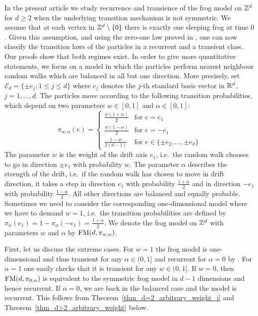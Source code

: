 In the present article we study recurrence and transience of the frog model on $\mathbb{Z}^d$ for $d \geq 2$ when the underlying transition mechanism is not  symmetric. We assume that at each vertex in $\mathbb{Z}^d\setminus\{0\}$ there is exactly one sleeping frog at time $0$. 
Given this assumption, and using the zero-one law proved in \cite{KZ17}, one can now classify the transition laws of the particles in a recurrent and a transient class. Our proofs show that both regimes exist. In order to give more quantitative statements, we focus on a model in which the particles perform nearest neighbour random walks which are balanced in all but one direction. More precisely,
set $\mathcal{E}_d=\{\pm e_j \colon 1\leq j\leq d\}$ where $e_j$ denotes the $j$-th standard basis vector in $\mathbb{R}^d$, $j=1,\dotsc,d$. 
The particles move according to the following transition probabilities, which depend on two parameters $w \in [0,1]$ and $\alpha \in [0,1]$:
\begin{equation}\label{transition_function}
 \pi_{w,\alpha}(e) =
 \begin{cases}
  \frac{w(1+\alpha)}{2} & \text{for $e=e_1$} \\
  \frac{w(1-\alpha)}{2} & \text{for $e=-e_1$} \\
  \frac{1-w}{2(d-1)}    & \text{for $e \in\{\pm e_2,\dotsc, \pm e_d\}$} 
 \end{cases}
\end{equation}
The parameter $w$ is the weight of the drift axis $e_1$, i.e.~the random walk chooses to go in direction $\pm e_1$ with probability $w$. The parameter $\alpha$ describes the strength of the drift, i.e.~if the random walk has chosen to move in drift direction, it takes a step in direction $e_1$ with probability $\frac{1+\alpha}{2}$ and in direction $-e_1$ with probability $\frac{1-\alpha}{2}$. All other directions are balanced and equally probable.
Sometimes we need to consider the corresponding one-dimensional model where we have to demand $w=1$, i.e.~the transition probabilities are defined by $\pi_{\alpha}(e_1)=1-\pi_{\alpha}(-e_1)=\frac{1 + \alpha}{2}$. 
We denote the frog model on $\mathbb{Z}^d$ with parameters $w$ and $\alpha$ by $\operatorname{FM}(d,\pi_{w,\alpha})$.

First, let us discuss the extreme cases. For $w=1$ the frog model is one-dimensional and thus transient for any $\alpha \in (0,1]$ and recurrent for $\alpha=0$ by \cite{GS09}.
For $\alpha =1$ one easily checks that it is transient for any $w \in (0,1]$.
If $w=0$, then $\operatorname{FM}(d,\pi_{0, \alpha})$ is equivalent to the symmetric frog model in $d-1$ dimensions and hence recurrent.
If $\alpha =0$, we are back in the balanced case and the model is recurrent. This follows from Theorem~\ref{thm_d=2_arbitrary_weight_i} and Theorem~\ref{thm_d>2_arbitrary_weight} below.

